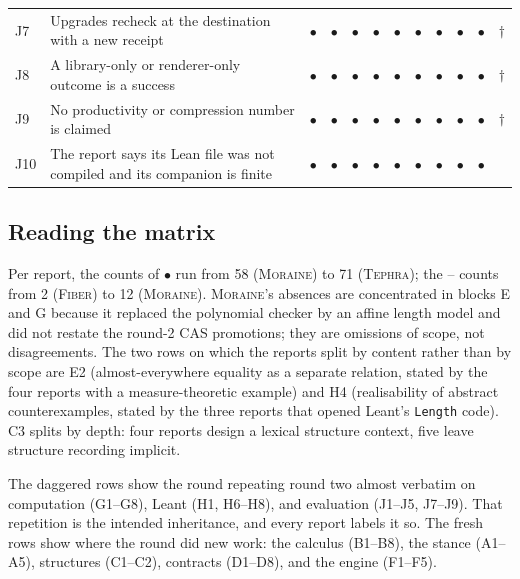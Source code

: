 \documentclass[11pt,a4paper]{article}
\newcommand{\code}[1]{\nolinkurl{#1}}
\newcommand{\Yy}{$\bullet$}
\newcommand{\Nn}{--}
\newcommand{\Fb}{\textsc{Fiber}}
\newcommand{\Mr}{\textsc{Moraine}}
\newcommand{\Tp}{\textsc{Tephra}}
\theoremstyle{definition}
\begin{document}
{\begin{longtable}{@{}L{7mm}L{65mm}CCCCCCCCCL{4mm}@{}}
J7 & Upgrades recheck at the destination with a new receipt & \Yy&\Yy&\Yy&\Yy&\Yy&\Yy&\Yy&\Yy&\Yy&$\dagger$\\
J8 & A library-only or renderer-only outcome is a success & \Yy&\Yy&\Yy&\Yy&\Yy&\Yy&\Yy&\Yy&\Yy&$\dagger$\\
J9 & No productivity or compression number is claimed & \Yy&\Yy&\Yy&\Yy&\Yy&\Yy&\Yy&\Yy&\Yy&$\dagger$\\
J10 & The report says its Lean file was not compiled and its companion is finite & \Yy&\Yy&\Yy&\Yy&\Yy&\Yy&\Yy&\Yy&\Yy&\\
\end{longtable}}

\subsection{Reading the matrix}
Per report, the counts of \Yy{} run from 58 (\Mr) to 71 (\Tp); the \Nn{} counts from 2 (\Fb) to 12 (\Mr). \Mr's absences are concentrated in blocks E and G because it replaced the polynomial checker by an affine length model and did not restate the round-2 CAS promotions; they are omissions of scope, not disagreements. The two rows on which the reports split by content rather than by scope are E2 (almost-everywhere equality as a separate relation, stated by the four reports with a measure-theoretic example) and H4 (realisability of abstract counterexamples, stated by the three reports that opened Leant's \code{Length} code). C3 splits by depth: four reports design a lexical structure context, five leave structure recording implicit.

The daggered rows show the round repeating round two almost verbatim on computation (G1--G8), Leant (H1, H6--H8), and evaluation (J1--J5, J7--J9). That repetition is the intended inheritance, and every report labels it so. The fresh rows show where the round did new work: the calculus (B1--B8), the stance (A1--A5), structures (C1--C2), contracts (D1--D8), and the engine (F1--F5).
\end{document}
